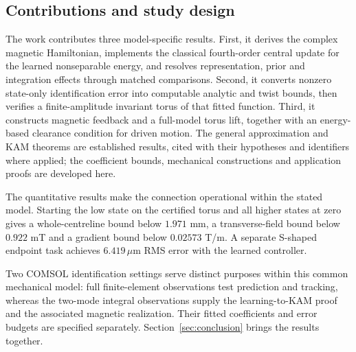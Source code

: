 \subsection{Contributions and study design}
The work contributes three model-specific results. First, it derives the complex magnetic Hamiltonian, implements the classical fourth-order central update for the learned nonseparable energy, and resolves representation, prior and integration effects through matched comparisons. Second, it converts nonzero state-only identification error into computable analytic and twist bounds, then verifies a finite-amplitude invariant torus of that fitted function. Third, it constructs magnetic feedback and a full-model torus lift, together with an energy-based clearance condition for driven motion. The general approximation and KAM theorems are established results, cited with their hypotheses and identifiers where applied; the coefficient bounds, mechanical constructions and application proofs are developed here.

The quantitative results make the connection operational within the stated model. Starting the low state on the certified torus and all higher states at zero gives a whole-centreline bound below $1.971$ mm, a transverse-field bound below $0.922$ mT and a gradient bound below $0.02573$ T/m. A separate S-shaped endpoint task achieves $6.419\,\mu$m RMS error with the learned controller.

Two COMSOL identification settings serve distinct purposes within this common mechanical model: full finite-element observations test prediction and tracking, whereas the two-mode integral observations supply the learning-to-KAM proof and the associated magnetic realization. Their fitted coefficients and error budgets are specified separately. Section~\ref{sec:conclusion} brings the results together.
